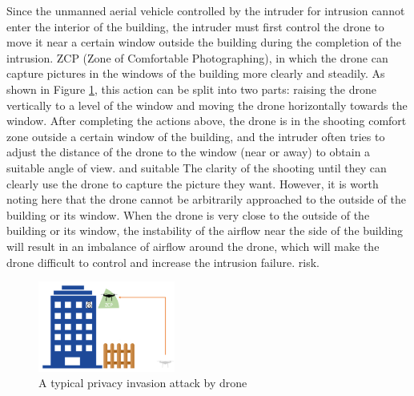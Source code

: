 \documentclass{sig-alternate-10pt}
\begin{document}
Since the unmanned aerial vehicle controlled by the intruder for intrusion cannot enter the interior of the building, the intruder must first control the drone to move it near a certain window outside the building during the completion of the intrusion. ZCP (Zone of Comfortable Photographing), in which the drone can capture pictures in the windows of the building more clearly and steadily. As shown in Figure \ref{zcp}, this action can be split into two parts: raising the drone vertically to a level of the window and moving the drone horizontally towards the window. After completing the actions above, the drone is in the shooting comfort zone outside a certain window of the building, and the intruder often tries to adjust the distance of the drone to the window (near or away) to obtain a suitable angle of view. and suitable The clarity of the shooting until they can clearly use the drone to capture the picture they want. However, it is worth noting here that the drone cannot be arbitrarily approached to the outside of the building or its window. When the drone is very close to the outside of the building or its window, the instability of the airflow near the side of the building will result in an imbalance of airflow around the drone, which will make the drone difficult to control and increase the intrusion failure. risk.
\begin{figure}[!h]
	\centering
	\includegraphics[width=0.4\textwidth]{pics/zcp.png}
	\caption{A typical privacy invasion attack by drone}
	\label{zcp}
\end{figure}
\end{document}
